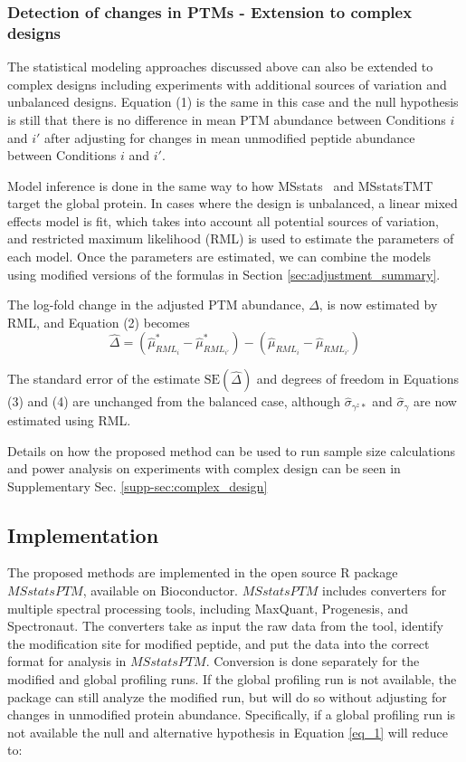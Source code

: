 \documentclass[mcp]{article}
\numberwithin{table}{section}
\begin{document}
\subsubsection*{Detection of changes in PTMs - Extension to complex designs}

The statistical modeling approaches discussed above can also be extended to complex designs including experiments with additional sources of variation and unbalanced designs. Equation (1) is the same in this case and the null hypothesis is still that there is no difference in mean PTM abundance between Conditions $i$ and $i'$ after adjusting for changes in mean unmodified peptide abundance between Conditions $i$ and $i'$. 

Model inference is done in the same way to how MSstats~\cite{Choi:2014} and MSstatsTMT~\cite{Huang:2020} target the global protein. In cases where the design is unbalanced, a linear mixed effects model is fit, which takes into account all potential sources of variation, and restricted maximum likelihood (RML) is used to estimate the parameters of each model. Once the parameters are estimated, we can combine the models using modified versions of the formulas in Section \ref{sec:adjustment_summary}.

The log-fold change in the adjusted PTM abundance, $\Delta$, is now estimated by RML, and Equation (2) becomes 
\begin{equation}
\hat{\Delta} = (\hat{\mu}_{RML_i}^{\ast} - \hat{\mu}_{RML_{i'}}^{\ast}) - (\hat{\mu}_{RML_i} - \hat{\mu}_{RML_{i'}})
\end{equation}

The standard error of the estimate $\mathrm{SE}(\hat{\Delta})$ and degrees of freedom in Equations (3) and (4) are unchanged from the balanced case, although $\hat{\sigma}_{\gamma^z\ast}$ and $\hat{\sigma}_{\gamma}$ are now estimated using RML.

Details on how the proposed method can be used to run sample size calculations and power analysis on experiments with complex design can be seen in Supplementary Sec. \ref{supp-sec:complex_design}

\subsection*{Implementation}

The proposed methods are implemented in the open source R package $MSstatsPTM$, available on Bioconductor. $MSstatsPTM$ includes converters for multiple spectral processing tools, including MaxQuant, Progenesis, and Spectronaut. The converters take as input the raw data from the tool, identify the modification site for modified peptide, and put the data into the correct format for analysis in $MSstatsPTM$. Conversion is done separately for the modified and global profiling runs. If the global profiling run is not available, the package can still analyze the modified run, but will do so without adjusting for changes in unmodified protein abundance. Specifically, if a global profiling run is not available the null and alternative hypothesis in Equation \ref{eq_1} will reduce to:
\end{document}

